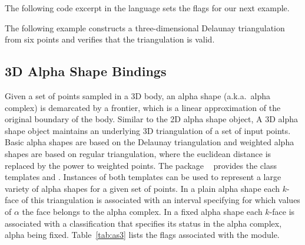 The following code excerpt in the \cmake{} language sets the \cmake{} flags for our next example.

The following example constructs a three-dimensional Delaunay triangulation from six points and verifies that the triangulation is valid.

\subsection{3D Alpha Shape Bindings}
\label{ssec:modules:as3}
Given a set of points sampled in a 3D body, an alpha shape (a.k.a.\ alpha complex) is demarcated by a frontier, which is a linear approximation of the original boundary of the body. Similar to the 2D alpha shape object, A 3D alpha shape object maintains an underlying 3D triangulation of a set of input points. Basic alpha shapes are based on the Delaunay triangulation and weighted alpha shapes are based on regular triangulation, where the euclidean distance is replaced by the
power to weighted points. The package \iiiDAlphaShapesPackage{}~\cite{cgal:dy-as3-21a} provides the class templates  and . Instances of both templates can be used to represent a large variety of alpha shapes for a given set of points. In a plain alpha shape each $k$-face of this triangulation is associated with an interval specifying for which values of $\alpha$ the face belongs to the alpha complex. In a fixed alpha shape each $k$-face is associated with a classification that specifies its status in the alpha complex, alpha being fixed. Table~\ref{tab:as3} lists the \cmake{} flags associated with the \iiiDAlphaShapesPackage{} module.

\begin{table}[!htp]
  \caption{\iiiDAlphaShapesPackage{} module flags}
  \centering{}
 \label{tab:as3}
\end{table}

